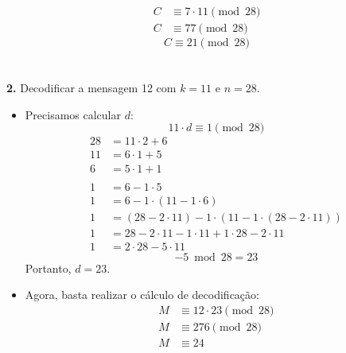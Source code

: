 \begin{align*}
    C & \equiv 7 \cdot 11 \pmod {28} \\
    C & \equiv 77 \pmod {28}
\end{align*}
\[
    \boxed{C \equiv 21 \pmod {28}}
\]\\\\
\vspace{24pt}
\textbf{2.} Decodificar a mensagem 12 com $k = 11$ e $n = 28$.
\begin{itemize}
    \item Precisamos calcular $d$:\\
          \[
              11 \cdot d \equiv 1 \pmod {28}
          \]
          \begin{align*}
              28 & = 11 \cdot 2 + 6                                               \\
              11 & = 6 \cdot 1 + 5                                                \\
              6  & = 5 \cdot 1 + 1                                                \\
              \\
              1  & = 6 - 1 \cdot 5                                                \\
              1  & = 6 - 1 \cdot (11 - 1 \cdot 6)                                 \\
              1  & = (28 - 2 \cdot 11) - 1 \cdot (11 - 1 \cdot (28 - 2 \cdot 11)) \\
              1  & = 28 - 2 \cdot 11 - 1 \cdot 11 + 1 \cdot 28 -2 \cdot 11        \\
              1  & = 2 \cdot 28 - 5 \cdot 11
          \end{align*}
          \[
              -5 \bmod 28  = 23
          \]
          Portanto, $d = 23$.
    \item Agora, basta realizar o cálculo de decodificação:
          \begin{align*}
              M & \equiv 12 \cdot 23 \pmod {28} \\
              M & \equiv 276 \pmod {28}         \\
              M & \equiv 24
          \end{align*}
\end{itemize}